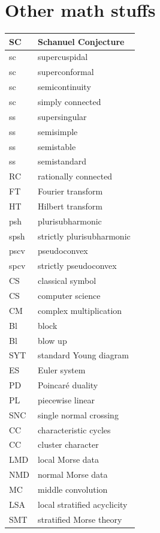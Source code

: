 \documentclass{amsart}
\numberwithin{equation}{section}
\theoremstyle{plain}
\numberwithin{equation}{section}
\theoremstyle{remark}
\begin{document}
\section{Other math stuffs}
\begin{longtable}{l|l}
\hline
SC & Schanuel Conjecture \\ \hline
sc & supercuspidal\\ \hline
sc & superconformal\\ \hline
sc & semicontinuity\\ \hline
sc & simply connected\\ \hline
ss & supersingular\\ \hline
ss & semisimple\\ \hline
ss & semistable\\ \hline
ss & semistandard\\ \hline
RC & rationally connected\\ \hline
FT & Fourier transform\\ \hline
HT & Hilbert transform\\ \hline
psh & plurisubharmonic\\ \hline
spsh & strictly plurisubharmonic\\ \hline
pscv & pseudoconvex\\ \hline
spcv & strictly pseudoconvex\\ \hline 
CS & classical symbol\\ \hline
CS & computer science\\ \hline
CM & complex multiplication\\ \hline
Bl  & block\\ \hline
Bl  & blow up\\ \hline
SYT  & standard Young diagram\\ \hline
ES  & Euler system\\ \hline
PD & Poincaré duality\\ \hline
PL & piecewise linear\\ \hline
SNC & single normal crossing\\ \hline
CC & characteristic cycles\\ \hline
CC & cluster character\\ \hline
LMD & local Morse data\\ \hline
NMD & normal Morse data\\ \hline
MC & middle convolution\\ \hline
LSA & local stratified acyclicity\\ \hline
SMT & stratified Morse theory\\ \hline

\end{longtable}
\end{document}
